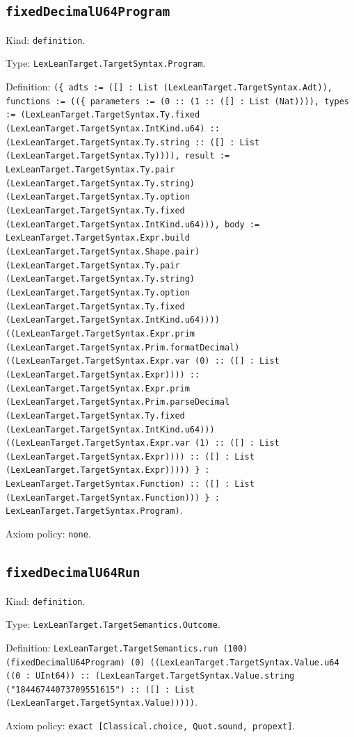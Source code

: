 \documentclass[11pt]{article}
\begin{document}
\subsection*{\texttt{fixedDecimalU64Program}}
\noindent Kind: \texttt{definition}.\par
\noindent Type: \texttt{LexLeanTarget.TargetSyntax.Program}.\par
\noindent Definition: \texttt{(\{ adts := ([] : List (LexLeanTarget.TargetSyntax.Adt)), functions := ((\{ parameters := (0 :: (1 :: ([] : List (Nat)))), types := (LexLeanTarget.TargetSyntax.Ty.fixed (LexLeanTarget.TargetSyntax.IntKind.u64) :: (LexLeanTarget.TargetSyntax.Ty.string :: ([] : List (LexLeanTarget.TargetSyntax.Ty)))), result := LexLeanTarget.TargetSyntax.Ty.pair (LexLeanTarget.TargetSyntax.Ty.string) (LexLeanTarget.TargetSyntax.Ty.option (LexLeanTarget.TargetSyntax.Ty.fixed (LexLeanTarget.TargetSyntax.IntKind.u64))), body := LexLeanTarget.TargetSyntax.Expr.build (LexLeanTarget.TargetSyntax.Shape.pair) (LexLeanTarget.TargetSyntax.Ty.pair (LexLeanTarget.TargetSyntax.Ty.string) (LexLeanTarget.TargetSyntax.Ty.option (LexLeanTarget.TargetSyntax.Ty.fixed (LexLeanTarget.TargetSyntax.IntKind.u64)))) ((LexLeanTarget.TargetSyntax.Expr.prim (LexLeanTarget.TargetSyntax.Prim.formatDecimal) ((LexLeanTarget.TargetSyntax.Expr.var (0) :: ([] : List (LexLeanTarget.TargetSyntax.Expr)))) :: (LexLeanTarget.TargetSyntax.Expr.prim (LexLeanTarget.TargetSyntax.Prim.parseDecimal (LexLeanTarget.TargetSyntax.Ty.fixed (LexLeanTarget.TargetSyntax.IntKind.u64))) ((LexLeanTarget.TargetSyntax.Expr.var (1) :: ([] : List (LexLeanTarget.TargetSyntax.Expr)))) :: ([] : List (LexLeanTarget.TargetSyntax.Expr))))) \} : LexLeanTarget.TargetSyntax.Function) :: ([] : List (LexLeanTarget.TargetSyntax.Function))) \} : LexLeanTarget.TargetSyntax.Program)}.\par
\noindent Axiom policy: \texttt{none}.\par
\subsection*{\texttt{fixedDecimalU64Run}}
\noindent Kind: \texttt{definition}.\par
\noindent Type: \texttt{LexLeanTarget.TargetSemantics.Outcome}.\par
\noindent Definition: \texttt{LexLeanTarget.TargetSemantics.run (100) (fixedDecimalU64Program) (0) ((LexLeanTarget.TargetSyntax.Value.u64 ((0 : UInt64)) :: (LexLeanTarget.TargetSyntax.Value.string ("18446744073709551615") :: ([] : List (LexLeanTarget.TargetSyntax.Value)))))}.\par
\noindent Axiom policy: \texttt{exact [Classical.choice, Quot.sound, propext]}.\par
\end{document}
